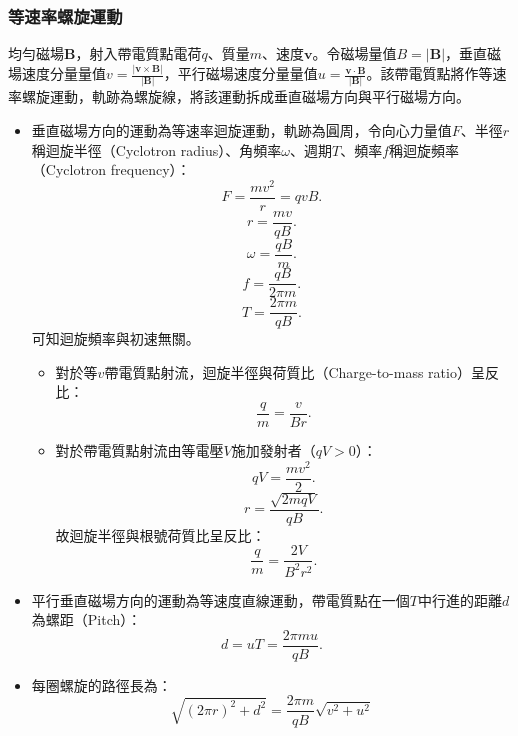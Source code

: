 \documentclass[a4paper,12pt]{report}
\begin{document}
\begin{itemize}
\subsubsection{等速率螺旋運動}
均勻磁場$\mathbf{B}$，射入帶電質點電荷$q$、質量$m$、速度$\mathbf{v}$。令磁場量值$B=|\mathbf{B}|$，垂直磁場速度分量量值$v=\frac{|\mathbf{v}\times\mathbf{B}|}{|\mathbf{B}|}$，平行磁場速度分量量值$u=\frac{\mathbf{v}\cdot\mathbf{B}}{|\mathbf{B}|}$。該帶電質點將作等速率螺旋運動，軌跡為螺旋線，將該運動拆成垂直磁場方向與平行磁場方向。
\begin{itemize}
\item 垂直磁場方向的運動為等速率迴旋運動，軌跡為圓周，令向心力量值$F$、半徑$r$稱迴旋半徑（Cyclotron radius）、角頻率$\omega$、週期$T$、頻率$f$稱迴旋頻率（Cyclotron frequency）：
\[F=\frac{mv^2}{r}=qvB.\]
\[r=\frac{mv}{qB}.\]
\[\omega=\frac{qB}{m}.\]
\[f=\frac{qB}{2\pi m}.\]
\[T=\frac{2\pi m}{qB}.\]
可知迴旋頻率與初速無關。
\begin{itemize}
\item 對於等$v$帶電質點射流，迴旋半徑與荷質比（Charge-to-mass ratio）呈反比：
\[\frac{q}{m}=\frac{v}{Br}.\]
\item 對於帶電質點射流由等電壓$V$施加發射者（$qV>0$）：
\[qV=\frac{mv^2}{2}.\]
\[r=\frac{\sqrt{2mqV}}{qB}.\]
故迴旋半徑與根號荷質比呈反比：
\[\frac{q}{m}=\frac{2V}{B^2r^2}.\]
\end{itemize}
\item 平行垂直磁場方向的運動為等速度直線運動，帶電質點在一個$T$中行進的距離$d$為螺距（Pitch）：
\[d=uT=\frac{2\pi mu}{qB}.\]
\item 每圈螺旋的路徑長為：
\[\sqrt{(2\pi r)^2+d^2}=\frac{2\pi m}{qB}\sqrt{v^2+u^2}\]
\end{itemize}

\end{itemize}
\end{document}
